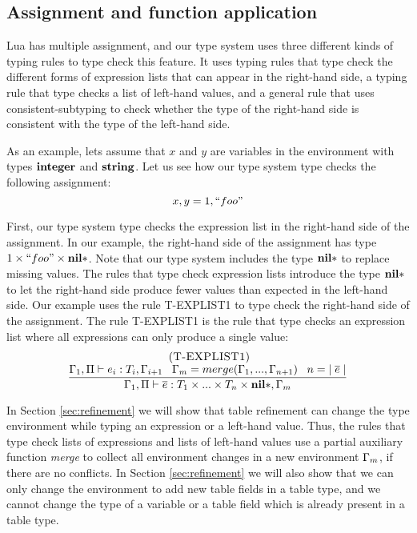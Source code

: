\subsection{Assignment and function application}
\label{sec:assignment}

Lua has multiple assignment, and our type system uses three
different kinds of typing rules to type check this feature.
It uses typing rules that type check the different forms
of expression lists that can appear in the right-hand side,
a typing rule that type checks a list of left-hand values,
and a general rule that uses consistent-subtyping to check
whether the type of the right-hand side is consistent with
the type of the left-hand side.

As an example, lets assume that $x$ and $y$ are variables in the
environment with types $\mathbf{integer}$ and $\mathbf{string}$.
Let us see how our type system type checks the following assignment:
\[
x, y = 1, ``foo"
\]

First, our type system type checks the expression list in the right-hand
side of the assignment.
In our example, the right-hand side of the assignment has type
$1 \times ``foo" \times \mathbf{nil}{*}$.
Note that our type system includes the type $\mathbf{nil}{*}$ to replace
missing values.
The rules that type check expression lists introduce the type
$\mathbf{nil}{*}$ to let the right-hand side produce fewer values than
expected in the left-hand side.
Our example uses the rule \textsc{T-EXPLIST1} to type check
the right-hand side of the assignment.
The rule \textsc{T-EXPLIST1} is the rule that type checks an
expression list where all expressions can only produce a single value:
\[
\begin{array}{c}
\; (\textsc{T-EXPLIST1})\\
\dfrac{\Gamma_{1}, \Pi \vdash e_{i}:T_{i}, \Gamma_{i+1} \;\;\;
       \Gamma_{m} = merge(\Gamma_{1}, ..., \Gamma_{n+1}) \;\;\;
       n = |\;\overline{e}\;|}
      {\Gamma_{1}, \Pi \vdash \overline{e}:T_{1} \times ... \times T_{n} \times \mathbf{nil}{*}, \Gamma_{m}}
\end{array}
\]

In Section \ref{sec:refinement} we will show that table refinement can
change the type environment while typing an expression or a left-hand value.
Thus, the rules that type check lists of expressions and lists of
left-hand values use a partial auxiliary function \emph{merge} to collect
all environment changes in a new environment $\Gamma_{m}$, if there are no conflicts.
In Section \ref{sec:refinement} we will also show that we can only change the
environment to add new table fields in a table type, and we cannot change the
type of a variable or a table field which is already present in a table type.

